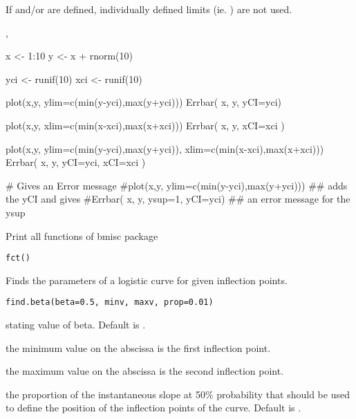 \documentclass[a4paper]{book}
\begin{document}
%
\begin{Details}\relax
If  and/or  are defined, individually defined limits (ie. ) are not used.
\end{Details}
%
\begin{SeeAlso}\relax
{}, 
\end{SeeAlso}
%
\begin{Examples}
\begin{ExampleCode}
x <- 1:10
y <- x + rnorm(10)

yci <- runif(10)
xci <- runif(10)

plot(x,y, ylim=c(min(y-yci),max(y+yci)))
Errbar( x, y, yCI=yci)

plot(x,y, xlim=c(min(x-xci),max(x+xci)))
Errbar( x, y, xCI=xci )

plot(x,y, ylim=c(min(y-yci),max(y+yci)), xlim=c(min(x-xci),max(x+xci)))
Errbar( x, y, yCI=yci, xCI=xci )

# Gives an Error message
#plot(x,y, ylim=c(min(y-yci),max(y+yci)))  ## adds the yCI and gives
#Errbar( x, y, ysup=1, yCI=yci)            ## an error message for the ysup

\end{ExampleCode}
\end{Examples}
\newpage
{}
%
\begin{Description}\relax
Print all functions of bmisc package
\end{Description}
%
\begin{Usage}
\begin{verbatim}
fct()
\end{verbatim}
\end{Usage}
\newpage
{}
%
\begin{Description}\relax
Finds the parameters of a logistic curve for given inflection points.
\end{Description}
%
\begin{Usage}
\begin{verbatim}
find.beta(beta=0.5, minv, maxv, prop=0.01)
\end{verbatim}
\end{Usage}
%
\begin{Arguments}
\begin{ldescription}
\item[\code{beta}] stating value of beta. Default is .
\item[\code{minv}] the minimum value on the abscissa is the first inflection point.
\item[\code{maxv}] the maximum value on the abscissa is the second inflection point.
\item[\code{prop}] the proportion of the instantaneous slope at 50\% probability that should be used to define the position of the inflection points of the curve. Default is .


\end{ldescription}
\end{Arguments}
\end{document}

